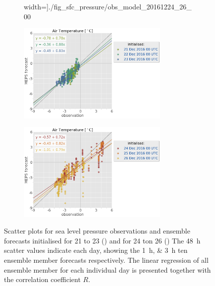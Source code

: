 \begin{figure}[t!]
\begin{subfigure}[b]{0.49\textwidth}
		width=\textwidth]{./fig_sfc_pressure/obs_model_20161224_26_00}
		\caption{}\label{fig:scat:pres2426}
	\end{subfigure}
	\begin{subfigure}[b]{0.49\textwidth}
		\centering
		\includegraphics[trim={25.cm 15.5cm 0cm 3.6cm},clip,
		width=0.8\textwidth]{./fig_sfc_temp/obs_model_20161221_23_00_label}
	\end{subfigure}
	\begin{subfigure}[b]{0.49\textwidth}
		\centering
		\includegraphics[trim={25.cm 15.5cm 0cm 3.6cm},clip,
		width=0.8\textwidth]{./fig_sfc_temp/obs_model_20161224_26_00_label}
	\end{subfigure}
	\caption{Scatter plots for sea level pressure observations and ensemble forecasts initialised for \num{21} to \SI{23}{\dec} (\protect{})
    and  for \num{24} ton \SI{26}{\dec} (\protect{})
    The \SI{48}{\hour} scatter values indicate each day, showing the \SIlist{1;3}{\hour} ten ensemble member forecasts respectively. The linear regression of all ensemble member for each individual day is presented together with the correlation coefficient $R$. %
    }\label{fig:scat:SLP}
\end{figure}
